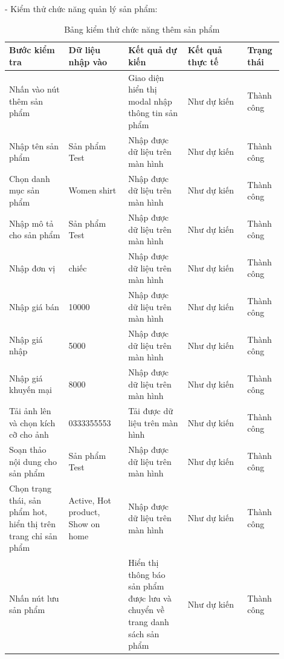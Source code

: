 - Kiểm thử chức năng quản lý sản phẩm:
\begin{longtable}[htp]{ |m{0.2\linewidth}|m{0.2\linewidth}|m{0.2\linewidth}|m{0.2\linewidth}|m{0.1\linewidth}|}
 \caption{Bảng kiểm thử chức năng thêm sản phẩm \label{updateProduct}}\\
 \hline
 Bước kiểm tra & Dữ liệu nhập vào & Kết quả dự kiến & Kết quả thực tế & Trạng thái \\
 \hline
  Nhấn vào nút thêm sản phẩm & & Giao diện hiển thị modal nhập thông tin sản phẩm & Như dự kiến & Thành công\\
 \hline
   Nhập tên sản phẩm & Sản phẩm Test & Nhập được dữ liệu trên màn hình & Như dự kiến & Thành công\\
 \hline
   Chọn danh mục sản phẩm & Women shirt & Nhập được dữ liệu trên màn hình & Như dự kiến & Thành công\\
 \hline
   Nhập mô tả cho sản phẩm & Sản phẩm Test & Nhập được dữ liệu trên màn hình & Như dự kiến & Thành công\\
 \hline
   Nhập đơn vị & chiếc & Nhập được dữ liệu trên màn hình & Như dự kiến & Thành công\\
 \hline
   Nhập giá bán  & 10000 & Nhập được dữ liệu trên màn hình & Như dự kiến & Thành công\\
 \hline
   Nhập giá nhập & 5000 & Nhập được dữ liệu trên màn hình & Như dự kiến & Thành công\\
 \hline
   Nhập giá khuyến mại & 8000 & Nhập được dữ liệu trên màn hình & Như dự kiến & Thành công\\
 \hline
   Tải ảnh lên và chọn kích cỡ cho ảnh & 0333355553 & Tải được dữ liệu trên màn hình & Như dự kiến & Thành công\\
 \hline
   Soạn thảo nội dung cho sản phẩm & Sản phẩm Test & Nhập được dữ liệu trên màn hình & Như dự kiến & Thành công\\
 \hline
    Chọn trạng thái, sản phẩm hot, hiển thị trên trang chỉ sản phẩm & Active, Hot product, Show on home & Nhập được dữ liệu trên màn hình & Như dự kiến & Thành công\\
 \hline
    Nhấn nút lưu sản phẩm && Hiển thị thông báo sản phẩm được lưu và chuyển về trang danh sách sản phẩm  & Như dự kiến & Thành công\\
 \hline
\end{longtable}


